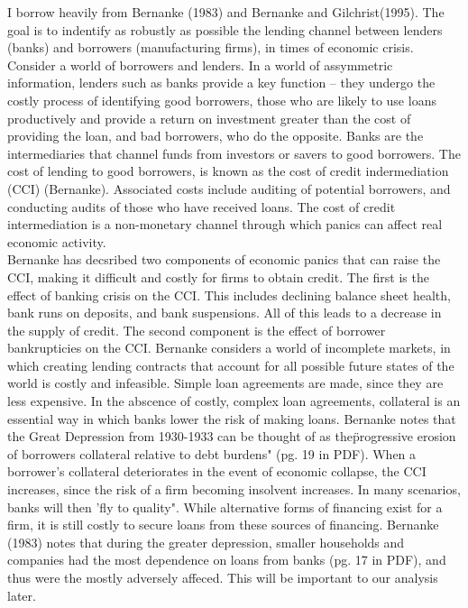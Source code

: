 \documentclass[letter,11pt]{article}
\begin{document}
{\indent I borrow heavily from Bernanke (1983) and Bernanke and Gilchrist(1995). The goal is to indentify as robustly as possible the lending channel between lenders (banks) and borrowers (manufacturing firms), in times of economic crisis. Consider a world of borrowers and lenders. In a world of assymmetric information, lenders such as banks provide a key function -- they undergo the costly process of identifying good borrowers, those who are likely to use loans productively and provide a return on investment greater than the cost of providing the loan, and bad borrowers, who do the opposite. Banks are the intermediaries that channel funds from investors or savers to good borrowers. The cost of lending to good borrowers, is known as the cost of credit indermediation (CCI) (Bernanke). Associated costs include auditing of potential borrowers, and conducting audits of those who have received loans. The cost of credit intermediation is a non-monetary channel through which panics can affect real economic activity.
\\ 
\indent Bernanke has decsribed two components of economic panics that can raise the CCI, making it difficult and costly for firms to obtain credit. The first is the effect of banking crisis on the CCI. This includes declining balance sheet health, bank runs on deposits, and bank suspensions. All of this leads to a decrease in the supply of credit. The second component is the effect of borrower bankrupticies on the CCI. Bernanke considers a world of incomplete markets, in which creating lending contracts that account for all possible future states of the world is costly and infeasible. Simple loan agreements are made, since they are less expensive. In the abscence of costly, complex loan agreements, collateral is an essential way in which banks lower the risk of making loans. Bernanke notes that the Great Depression from 1930-1933 can be thought of as the\"progressive erosion of borrowers collateral relative to debt burdens" (pg. 19 in PDF). When a borrower's collateral deteriorates in the event of economic collapse, the CCI increases, since the risk of a firm becoming insolvent increases. In many scenarios, banks will then 'fly to quality". While alternative forms of financing exist for a firm, it is still costly to secure loans from these sources of financing. Bernanke (1983) notes that during the greater depression, smaller households and companies had the most dependence on loans from banks (pg. 17 in PDF), and thus were the mostly adversely affeced. This will be important to our analysis later. 
\\ \\ 
}
\end{document}
